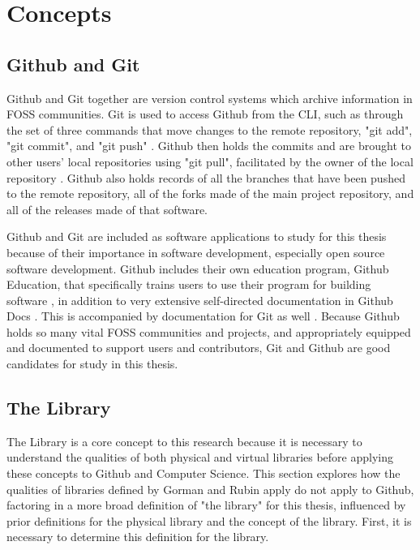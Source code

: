 \chapter{Concepts} 
\label{ch:concepts}

\section{Github and Git} 
\label{sec:library}

Github and Git together are version control systems which archive information in FOSS communities. Git is used to access Github from the CLI, such as through the set of three commands that move changes to the remote repository, "git add", "git commit", and "git push" \cite{gitdocs}. Github then holds the commits and are brought to other users' local repositories using "git pull", facilitated by the owner of the local repository \cite{gitdocs}. Github also holds records of all the branches that have been pushed to the remote repository, all of the forks made of the main project repository, and all of the releases made of that software. 

Github and Git are included as software applications to study for this thesis because of their importance in software development, especially open source software development. Github includes their own education program, Github Education, that specifically trains users to use their program for building software \cite{githubedu}, in addition to very extensive self-directed documentation in Github Docs \cite{githubdocs}. This is accompanied by documentation for Git as well \cite{gitdocs}. Because Github holds so many vital FOSS communities and projects, and appropriately equipped and documented to support users and contributors, Git and Github are good candidates for study in this thesis. 

\section{The Library} 
\label{sec:library}

The Library is a core concept to this research because it is necessary to understand the qualities of both physical and virtual libraries before applying these concepts to Github and Computer Science. This section explores how the qualities of libraries defined by Gorman and Rubin apply do not apply to Github, factoring in a more broad definition of "the library" for this thesis, influenced by prior definitions for the physical library and the concept of the library. First, it is necessary to determine this definition for the library. 

